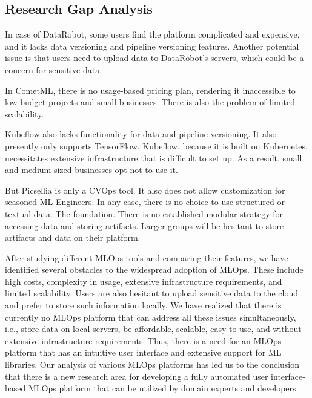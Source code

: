 \documentclass[12pt,a4paper]{report}     %
\begin{document}
\begin{normalsize}
{\section{Research Gap Analysis}

 In case of DataRobot, some users find the platform complicated and expensive, and it lacks data versioning and pipeline versioning features. Another potential issue is that users need to upload data to DataRobot's servers, which could be a concern for sensitive data.
\par
In CometML, there is no usage-based pricing plan, rendering it inaccessible to low-budget projects and small businesses. There is also the problem of limited scalability. 
\par
Kubeflow also lacks functionality for data and pipeline versioning. It also presently only supports TensorFlow. Kubeflow, because it is built on Kubernetes, necessitates extensive infrastructure that is difficult to set up. As a result, small and medium-sized businesses opt not to use it.
\par
But Picsellia is only a CVOps tool. It also does not allow customization for seasoned ML Engineers\cite{b7}. In any case, there is no choice to use structured or textual data. The foundation. There is no established modular strategy for accessing data and storing artifacts. Larger groups will be hesitant to store artifacts and data on their platform.
\par
After studying different MLOps tools and comparing their features, we have identified several obstacles to the widespread adoption of MLOps. These include high costs, complexity in usage, extensive infrastructure requirements, and limited scalability. Users are also hesitant to upload sensitive data to the cloud and prefer to store such information locally.
We have realized that there is currently no MLOps platform that can address all these issues simultaneously, i.e., store data on local servers, be affordable, scalable, easy to use, and without extensive infrastructure requirements. Thus, there is a need for an MLOps platform that has an intuitive user interface and extensive support for ML libraries. Our analysis of various MLOps platforms has led us to the conclusion that there is a new research area for developing a fully automated user interface-based MLOps platform that can be utilized by domain experts and developers.

}

\newpage 
\chapter{}
{\setlength{\baselineskip}{1.1\baselineskip}
}
\end{normalsize}
\end{document}
